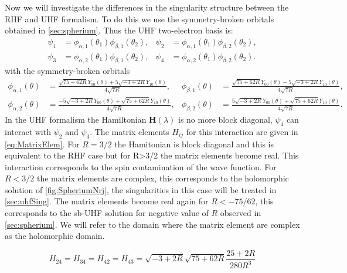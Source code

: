 \documentclass[11pt,a4paper]{article}
\newcommand{\bH}{\mathbf{H}}
\begin{document}
Now we will investigate the differences in the singularity structure between the RHF and UHF formalism. To do this we use the symmetry-broken orbitals obtained in \autoref{sec:spherium}. Thus the UHF two-electron basis is:
\begin{align}\label{eq:uhfbasis}
 \psi_1 & =\phi_{\alpha,1}(\theta_1)\phi_{\beta,1}(\theta_2),
 & 
 \psi_2 & =\phi_{\alpha,1}(\theta_1)\phi_{\beta,2}(\theta_2),\\
 \psi_3 & =\phi_{\alpha,2}(\theta_1)\phi_{\beta,1}(\theta_2),
 & 
 \psi_4 & =\phi_{\alpha,2}(\theta_1)\phi_{\beta,2}(\theta_2).
\end{align}
with the symmetry-broken orbitals
\begin{align*}\label{eq:uhforbitals}
 \phi_{\alpha,1}(\theta) & =\frac{\sqrt{75+62R}Y_{00}(\theta)+5\sqrt{-3+2R}Y_{10}(\theta)}{4\sqrt{7R}},
 & 
 \phi_{\beta,1}(\theta) & =\frac{\sqrt{75+62R}Y_{00}(\theta)-5\sqrt{-3+2R}Y_{10}(\theta)}{4\sqrt{7R}},\\
 \phi_{\alpha,2}(\theta) & =\frac{-5\sqrt{-3+2R}Y_{00}(\theta)+\sqrt{75+62R}Y_{10}(\theta)}{4\sqrt{7R}},
 & 
 \phi_{\beta,2}(\theta) & =\frac{5\sqrt{-3+2R}Y_{00}(\theta)+\sqrt{75+62R}Y_{10}(\theta)}{4\sqrt{7R}}.
\end{align*}
In the UHF formalism the Hamiltonian $\bH(\lambda)$ is no more block diagonal, $\psi_4$ can interact with $\psi_2$ and $\psi_3$. The matrix elements $H_{ij}$ for this interaction are given in \eqref{eq:MatrixElem}. For $R=3/2$ the Hamitonian is block diagonal and this is equivalent to the RHF case but for R>3/2 the matrix elements become real. This interaction corresponds to the spin contamination of the wave function. For $R<3/2$ the matrix elements are complex, this corresponds to the holomorphic solution of \autoref{fig:SpheriumNrj}, the singularities in this case will be treated in \autoref{sec:uhfSing}. The matrix elements become real again for $R<-75/62$, this corresponds to the sb-UHF solution for negative value of $R$ observed in \autoref{sec:spherium}. We will refer to the domain where the matrix element are complex as the holomorphic domain.

\begin{equation}\label{eq:MatrixElem}
H_{24}=H_{34}=H_{42}=H_{43}=\sqrt{-3+2R}\sqrt{75+62R}\frac{25+2R}{280R^3}
\end{equation}
\end{document}
